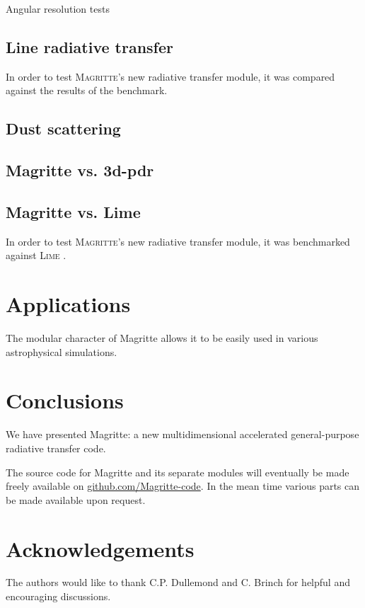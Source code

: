 \documentclass[a4paper,fleqn,usenatbib]{mnras}
\begin{document}
Angular resolution tests

\subsection{Line radiative transfer}

In order to test \textsc{Magritte}'s new radiative transfer module, it was compared against the results of the \citet{VanZadelhoff2002} benchmark.


\subsection{Dust scattering}


\subsection{{\sc Magritte} vs. {\sc 3d-pdr}}


\subsection{{\sc Magritte} vs. {\sc Lime}}
In order to test \textsc{Magritte}'s new radiative transfer module, it was benchmarked against \textsc{Lime} \citep{Brinch2010}.



\section{Applications}
\label{Applications}
The modular character of Magritte allows it to be easily used in various astrophysical simulations.




\section{Conclusions}
\label{Conclusions}
We have presented Magritte: a new multidimensional accelerated general-purpose radiative transfer code.

\bigskip

The source code for Magritte and its separate modules will eventually be made freely available on \href{https://github.com/Magritte-code}{github.com/Magritte-code}. In the mean time various parts can be made available upon request.




\section*{Acknowledgements}
The authors would like to thank C.P. Dullemond and C. Brinch for helpful and encouraging discussions.
\end{document}
